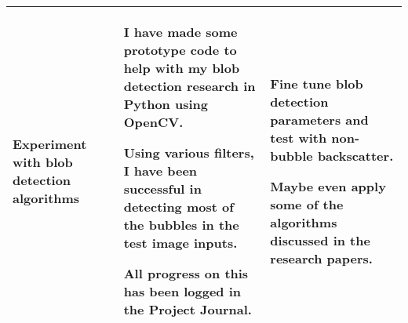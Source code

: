 \begin{table}[!h]
\begin{tabularx}{\textwidth}{|X|X|X|}
\begin{myitemize}
            \item Experiment with blob detection algorithms
        \end{myitemize} & 
        \begin{myitemize}
            \item I have made some prototype code to help with my blob detection research in Python using OpenCV.
            \item Using various filters, I have been successful in detecting most of the bubbles in the test image inputs.
            \item All progress on this has been logged in the Project Journal.
        \end{myitemize} & 
        \begin{myitemize}
            \item Fine tune blob detection parameters and test with non-bubble backscatter.
            \item Maybe even apply some of the algorithms discussed in the research papers.
        \end{myitemize} \\
        \hline
    \end{tabularx}
\end{table}

